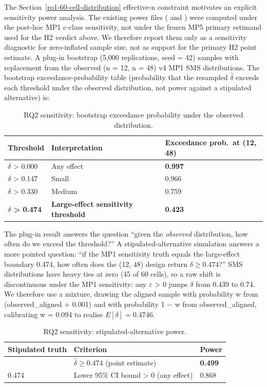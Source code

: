 \documentclass[manuscript,screen,review]{acmart}
\begin{document}
The Section~\ref{rq1-60-cell-distribution} effective-n constraint motivates an explicit sensitivity power analysis. The existing power files
( and
) were computed under
the post-hoc MP1 c-class sensitivity, not under the frozen MP5 primary
estimand used for the H2 verdict above. We therefore report them only as
a sensitivity diagnostic for zero-inflated sample size, not as support
for the primary H2 point estimate. A plug-in bootstrap (5,000
replications, seed = 42) samples with replacement from the observed
(n = 12, n = 48) v4 MP1 SMS distributions. The bootstrap
exceedance-probability table (probability that the resampled
$\hat\delta$ exceeds each threshold under the observed distribution, not
power against a stipulated alternative) is:

{%
\begin{longtable}[]{@{}lll@{}}
\caption{RQ2 sensitivity: bootstrap exceedance probability under the observed
distribution.}\\
\toprule\noalign{}
Threshold & Interpretation & Exceedance prob.\ at (12, 48) \\
\midrule\noalign{}
\endhead
\bottomrule\noalign{}
\endlastfoot
$\delta$ \textgreater{} 0.000 & Any effect & \textbf{0.997} \\
$\delta$ \textgreater{} 0.147 & Small & 0.966 \\
$\delta$ \textgreater{} 0.330 & Medium & 0.759 \\
\textbf{$\delta$ \textgreater{} 0.474} & \textbf{Large-effect sensitivity threshold} &
\textbf{0.423} \\
\end{longtable}
}

The plug-in result answers the question ``given the \emph{observed}
distribution, how often do we exceed the threshold?'' A
stipulated-alternative simulation answers a more pointed question: ``if
the MP1 sensitivity truth equals the large-effect boundary 0.474, how often does the (12,
48) design return $\delta \geq 0.474$?'' SMS distributions have heavy ties at zero
(45 of 60 cells), so a raw shift is discontinuous under the MP1
sensitivity: any $\varepsilon$ \textgreater{}
0 jumps $\delta$ from 0.439 to 0.74. We therefore use a mixture, drawing the
aligned sample with probability w from (observed\_aligned + 0.001) and
with probability 1 $-$ w from observed\_aligned, calibrating w = 0.094 to
realise $E[\delta] = 0.4746$.

{%
\begin{longtable}[]{@{}lll@{}}
\caption{RQ2 sensitivity: stipulated-alternative power.}\label{tab:p2-11}\\
\toprule\noalign{}
Stipulated truth & Criterion & Power \\
\midrule\noalign{}
\endfirsthead
\endhead
\bottomrule\noalign{}
\endlastfoot
0.474 & $\hat{\delta} \geq 0.474$ (point estimate) & \textbf{0.499} \\
0.474 & Lower 95\% CI bound \textgreater{} 0 (any effect) & 0.868 \\
\end{longtable}
}
\end{document}
